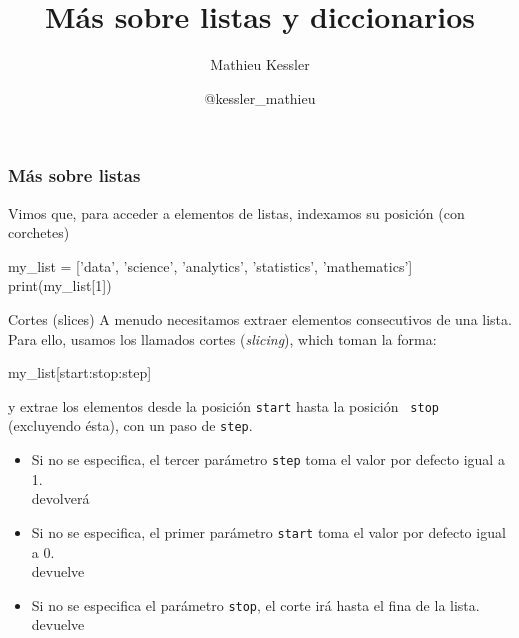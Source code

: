 \documentclass[handout,9pt]{beamer}
\begin{document}
\title{Más sobre listas y diccionarios}

\author[Mathieu Kessler]{Mathieu Kessler}
\date{@kessler\_mathieu}{}%

\begin{frame}
  \titlepage
\end{frame}


\begin{frame}[fragile]
  \frametitle{Más sobre listas}
  Vimos que, para acceder a elementos de listas, indexamos su posición
  (con corchetes)
{\footnotesize
  \begin{pyconsole}
my_list = ['data', 'science', 'analytics', 'statistics', 'mathematics']    
print(my_list[1])
\end{pyconsole}
}
\pause
\begin{block}{Cortes (slices)}
A menudo necesitamos extraer elementos consecutivos de una lista. Para
ello, usamos los llamados cortes (\textit{slicing}), which toman la forma:
\begin{pyverbatim}
my_list[start:stop:step]
\end{pyverbatim}
y extrae los elementos desde la posición  {\tt start} hasta la
posición  {\tt
  stop} (excluyendo ésta), con un paso de  {\tt step}.
\begin{itemize}
\item<3-> Si no se especifica, el tercer parámetro  {\tt step} toma el
  valor por defecto igual a 1.\\
  {\footnotesize
   devolverá }
\item<4-> Si no se especifica, el primer parámetro {\tt start} toma el
  valor por defecto igual a 0.\\
  {\footnotesize 
     devuelve 
    }
\item<5-> Si no se especifica el parámetro {\tt stop}, el corte irá
  hasta el fina de la lista.\\
  {\footnotesize
   devuelve
  }
\end{itemize}
\end{block}
\end{frame}
\end{document}
